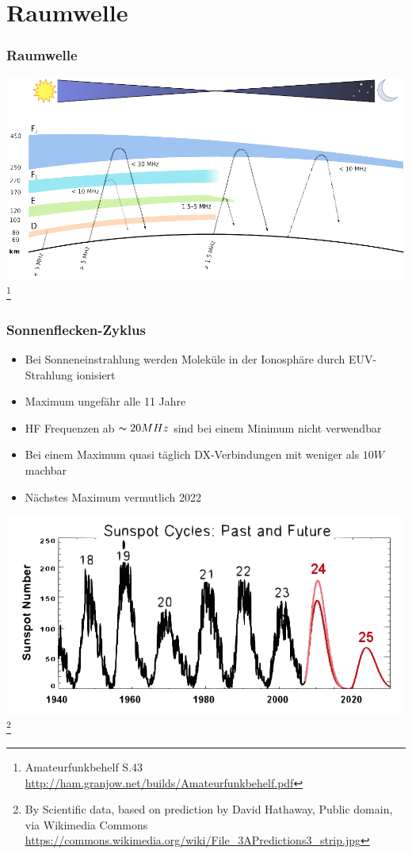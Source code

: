 \section*{Raumwelle}
    
\begin{frame}
    \frametitle{Raumwelle}
	\begin{center}
        \includegraphics[width=\textwidth,height=.8\textheight,keepaspectratio]{e09/schichten_behelf_43.png}
        \footnote{\tiny Amateurfunkbehelf S.43 \url{http://ham.granjow.net/builds/Amateurfunkbehelf.pdf}}
    \end{center}
\end{frame}

\begin{frame}
    \frametitle{Sonnenflecken-Zyklus}
    \begin{itemize}
    			\item Bei Sonneneinstrahlung werden Moleküle in der Ionosphäre durch EUV-Strahlung ionisiert
			\item Maximum ungefähr alle 11 Jahre
                        \item HF Frequenzen ab $\thicksim20MHz$ sind bei einem Minimum nicht verwendbar
       		 	\item Bei einem Maximum quasi täglich DX-Verbindungen mit weniger als $10W$ machbar 
        		\item Nächstes Maximum vermutlich 2022
    \end{itemize}
	\begin{center}
        \includegraphics[width=.8\textwidth,height=.4\textheight,keepaspectratio]{e09/Predictions_sunspot.png}
        \footnote{\tiny By Scientific data, based on prediction by David Hathaway, Public domain, via Wikimedia Commons \url{https://commons.wikimedia.org/wiki/File_3APredictions3_strip.jpg}} %
    \end{center}
\end{frame}

